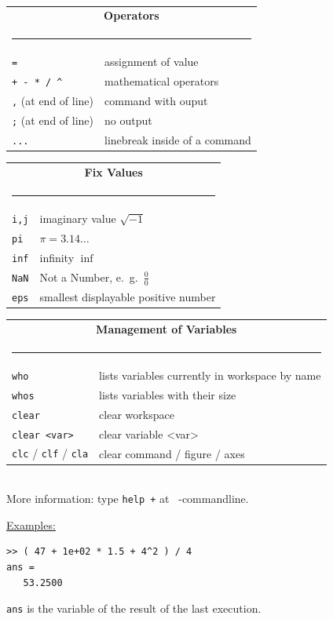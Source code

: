 $\phantom{x}$

\begin{tabular}{ll}
\multicolumn{2}{c}{\bf Operators}\\
\multicolumn{2}{c}{\rule{0.97\textwidth}{0pt}}\\[-2ex]\hline
\verb(=( & assignment of value\\
\verb(+ - * / ^( & mathematical operators\\
\verb(,( (at end of line) & command with ouput\\
\verb(;( (at end of line) & no output\\
\verb(...( & linebreak inside of a command\\
\hline
\end{tabular}

\begin{tabular}{ll}
\multicolumn{2}{c}{\bf Fix Values}\\
\multicolumn{2}{c}{\rule{0.97\textwidth}{0pt}}\\[-2ex]\hline
\verb(i,j( & imaginary value $\sqrt{-1}$\\
\verb(pi( & $\pi = 3.14\ldots$\\
\verb(inf(  & infinity $\inf$\\
\verb(NaN(  & Not a Number, e.\ g.\ $\frac{0}{0}$\\
\verb(eps( & smallest displayable positive number\\
\hline
\end{tabular}

\begin{tabular}{ll}
\multicolumn{2}{c}{\bf Management of Variables}\\
\multicolumn{2}{c}{\rule{0.97\textwidth}{0pt}}\\[-2ex]\hline
\verb(who( & lists variables currently in workspace by name\\
\verb(whos( & lists variables with their size\\
\verb(clear( & clear workspace\\
\verb(clear <var>( & clear variable <var>\\
\verb(clc( / \verb(clf( / \verb(cla( & clear command / figure / axes\\
\hline
\end{tabular}\\
More information: type \verb/help +/ at \matl\ -commandline.

\underline{Examples:}\\
\begin{minipage}[t]{0.5\textwidth}
\small\begin{verbatim}
>> ( 47 + 1e+02 * 1.5 + 4^2 ) / 4
ans =
   53.2500
\end{verbatim}
\end{minipage}
\hfill
\begin{minipage}[t]{0.49\textwidth}
\verb(ans( is the variable of the result of the last execution.
\end{minipage}\\

